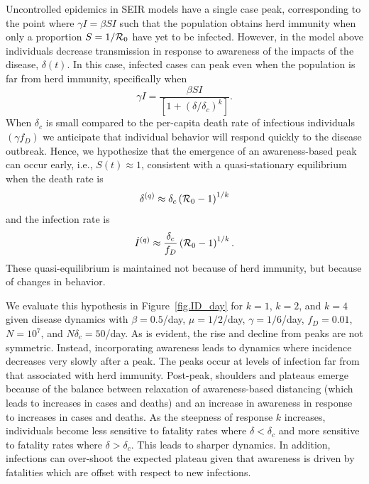 Uncontrolled epidemics in SEIR models have a single case peak, corresponding 
to the point where $\gamma I = \beta S I $ such that 
the population obtains herd immunity when only a proportion
$S=1/{\cal{R}}_0$ have yet to be infected.
However, in the model above individuals decrease transmission in response
to awareness of the impacts of the disease, $\delta(t)$.
In this case, infected cases can peak even when the population
is far from herd immunity, specifically when
\begin{equation}
\gamma I = \frac{\beta SI}{\left[1+\left(\delta/\delta_c\right)^{k}\right]}.
\end{equation}
When $\delta_c$ is small compared to the per-capita death rate of infectious individuals $(\gamma f_D)$ we anticipate that individual behavior will respond quickly to the disease outbreak.
Hence, we hypothesize that the
emergence of an
awareness-based peak can occur early, i.e., $S(t)\approx 1$, consistent
with a quasi-stationary equilibrium when the death rate is
\begin{equation}
\delta^{(q)} \approx \delta_c\left({\cal{R}}_0-1\right)^{1/k}
\end{equation}
and the infection rate is
\begin{equation}
\dot{I}^{(q)} \approx \frac{\delta_c}{f_D}\left({\cal{R}}_0-1\right)^{1/k}.
\end{equation}
These quasi-equilibrium is maintained not because of herd immunity, but because of changes in behavior. 

We evaluate this hypothesis in
Figure~\ref{fig.ID_day} for $k=1$, $k=2$, and $k=4$
given disease dynamics with $\beta=0.5$/day, $\mu=1/2$/day, $\gamma=1/6$/day,
$f_D=0.01$, $N=10^7$, and $N\delta_c=50$/day.  
As is evident, the rise and decline from peaks are not symmetric. Instead,
incorporating
awareness leads to dynamics where incidence decreases very slowly after a peak.
The peaks occur at levels of infection far from that associated
with herd immunity.  
Post-peak, shoulders and plateaus emerge because of the balance
between relaxation of awareness-based
distancing (which leads to increases in cases and deaths) and an 
increase in awareness in response to increases in cases and deaths.  
As the steepness of response $k$ increases, 
individuals become less sensitive to fatality rates
where $\delta < \delta_c$ and more sensitive to fatality rates where $\delta > \delta_c$.  
This leads to sharper dynamics. In addition, 
infections can over-shoot the expected plateau given that awareness
is driven by fatalities which are offset with respect to new infections.

